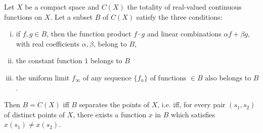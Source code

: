\begin{theoremn} Let $X$ be a compact space and $C(X)$ the totality of real-valued continuous functions on $X$. Let a subset $B$ of $C(X)$ satisfy the three conditions: \begin{enumerate}[(i)]
\item if $f, g \in B$, then the function product $f \cdot g$ and linear combinations $\alpha f + \beta g$, with real coefficients $\alpha, \beta$, belong to $B$,
\item the constant function $1$ belongs to $B$
\item the uniform limit $f_{\infty}$ of any sequence $\{f_n\}$ of functions $\in B$ also belongs to $B$.
\end{enumerate}
 Then $B = C(X)$ iff $B$ separates the points of $X$, i.e. iff, for every pair $(s_1, s_2)$ of distinct points of $X$, there exists a function $x$ in $B$ which satisfies $x(s_1) \neq x(s_2)$. 
\end{theoremn}

